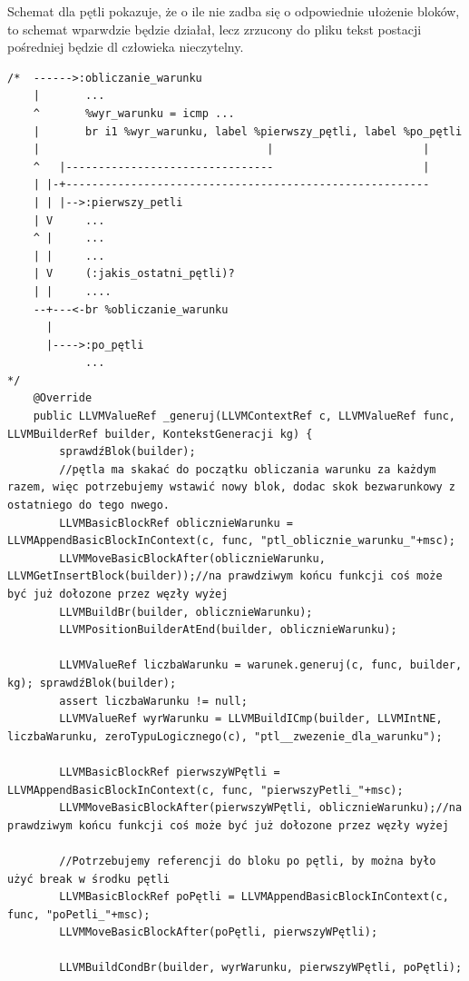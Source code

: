 Schemat dla pętli pokazuje, że o ile nie zadba się o odpowiednie ułożenie bloków, to schemat wparwdzie będzie działał, lecz zrzucony do pliku tekst postacji pośredniej będzie dl człowieka nieczytelny.
\lstset{
    escapechar=`,
    breaklines=true
}
\begin{lstlisting}[basicstyle=\scriptsize]
/*  ------>:obliczanie_warunku
    |       ...
    ^       %wyr_warunku = icmp ...
    |       br i1 %wyr_warunku, label %pierwszy_pętli, label %po_pętli
    |                                   |                       |
    ^   |--------------------------------                       |
    | |-+--------------------------------------------------------
    | | |-->:pierwszy_petli
    | V     ...
    ^ |     ...
    | |     ...
    | V     (:jakis_ostatni_pętli)?
    | |     ....
    --+---<-br %obliczanie_warunku
      |
      |---->:po_pętli
            ...
*/
    @Override
    public LLVMValueRef _generuj(LLVMContextRef c, LLVMValueRef func, LLVMBuilderRef builder, KontekstGeneracji kg) {
        sprawdźBlok(builder);
        //pętla ma skakać do początku obliczania warunku za każdym razem, więc potrzebujemy wstawić nowy blok, dodac skok bezwarunkowy z ostatniego do tego nwego.
        LLVMBasicBlockRef oblicznieWarunku = LLVMAppendBasicBlockInContext(c, func, "ptl_oblicznie_warunku_"+msc);
        LLVMMoveBasicBlockAfter(oblicznieWarunku, LLVMGetInsertBlock(builder));//na prawdziwym końcu funkcji coś może być już dołozone przez węzły wyżej
        LLVMBuildBr(builder, oblicznieWarunku);
        LLVMPositionBuilderAtEnd(builder, oblicznieWarunku);

        LLVMValueRef liczbaWarunku = warunek.generuj(c, func, builder, kg); sprawdźBlok(builder);
        assert liczbaWarunku != null;
        LLVMValueRef wyrWarunku = LLVMBuildICmp(builder, LLVMIntNE, liczbaWarunku, zeroTypuLogicznego(c), "ptl__zwezenie_dla_warunku");

        LLVMBasicBlockRef pierwszyWPętli = LLVMAppendBasicBlockInContext(c, func, "pierwszyPetli_"+msc);
        LLVMMoveBasicBlockAfter(pierwszyWPętli, oblicznieWarunku);//na prawdziwym końcu funkcji coś może być już dołozone przez węzły wyżej

        //Potrzebujemy referencji do bloku po pętli, by można było użyć break w środku pętli
        LLVMBasicBlockRef poPętli = LLVMAppendBasicBlockInContext(c, func, "poPetli_"+msc);
        LLVMMoveBasicBlockAfter(poPętli, pierwszyWPętli);

        LLVMBuildCondBr(builder, wyrWarunku, pierwszyWPętli, poPętli);


\end{lstlisting}

